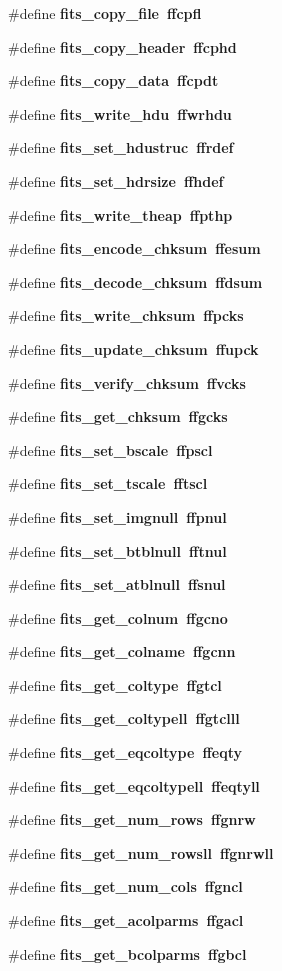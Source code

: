 \begin{CompactItemize}
\#define \bf{fits\_\-copy\_\-file}~ffcpfl
\item 
\#define \bf{fits\_\-copy\_\-header}~ffcphd
\item 
\#define \bf{fits\_\-copy\_\-data}~ffcpdt
\item 
\#define \bf{fits\_\-write\_\-hdu}~ffwrhdu
\item 
\#define \bf{fits\_\-set\_\-hdustruc}~ffrdef
\item 
\#define \bf{fits\_\-set\_\-hdrsize}~ffhdef
\item 
\#define \bf{fits\_\-write\_\-theap}~ffpthp
\item 
\#define \bf{fits\_\-encode\_\-chksum}~ffesum
\item 
\#define \bf{fits\_\-decode\_\-chksum}~ffdsum
\item 
\#define \bf{fits\_\-write\_\-chksum}~ffpcks
\item 
\#define \bf{fits\_\-update\_\-chksum}~ffupck
\item 
\#define \bf{fits\_\-verify\_\-chksum}~ffvcks
\item 
\#define \bf{fits\_\-get\_\-chksum}~ffgcks
\item 
\#define \bf{fits\_\-set\_\-bscale}~ffpscl
\item 
\#define \bf{fits\_\-set\_\-tscale}~fftscl
\item 
\#define \bf{fits\_\-set\_\-imgnull}~ffpnul
\item 
\#define \bf{fits\_\-set\_\-btblnull}~fftnul
\item 
\#define \bf{fits\_\-set\_\-atblnull}~ffsnul
\item 
\#define \bf{fits\_\-get\_\-colnum}~ffgcno
\item 
\#define \bf{fits\_\-get\_\-colname}~ffgcnn
\item 
\#define \bf{fits\_\-get\_\-coltype}~ffgtcl
\item 
\#define \bf{fits\_\-get\_\-coltypell}~ffgtclll
\item 
\#define \bf{fits\_\-get\_\-eqcoltype}~ffeqty
\item 
\#define \bf{fits\_\-get\_\-eqcoltypell}~ffeqtyll
\item 
\#define \bf{fits\_\-get\_\-num\_\-rows}~ffgnrw
\item 
\#define \bf{fits\_\-get\_\-num\_\-rowsll}~ffgnrwll
\item 
\#define \bf{fits\_\-get\_\-num\_\-cols}~ffgncl
\item 
\#define \bf{fits\_\-get\_\-acolparms}~ffgacl
\item 
\#define \bf{fits\_\-get\_\-bcolparms}~ffgbcl

\end{CompactItemize}
